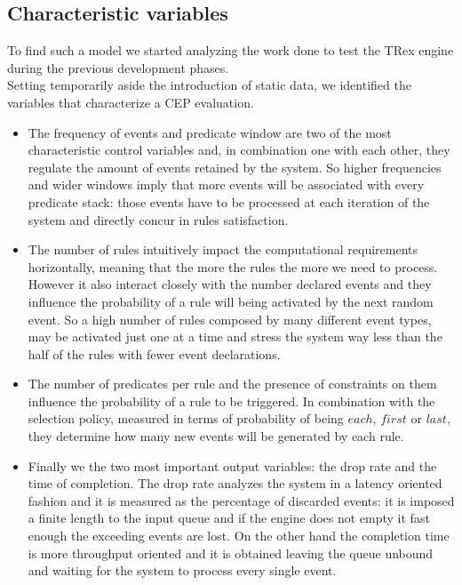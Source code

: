 \subsection{Characteristic variables}
To find such a model we started analyzing the work done to test the TRex engine during the previous development phases.\\
Setting temporarily aside the introduction of static data, we identified the variables that characterize a CEP evaluation.
\begin{itemize}
\item The frequency of events and predicate window are two of the most characteristic control variables and, in combination one with each other, they regulate the amount of events retained by the system. So higher frequencies and wider windows imply that more events will be associated with every predicate stack: those events have to be processed at each iteration of the system and directly concur in rules satisfaction.
\item The number of rules intuitively impact the computational requirements horizontally, meaning that the more the rules the more we need to process. However it also interact closely with the number declared events and they influence the probability of a rule will being activated by the next random event. So a high number of rules composed by many different event types, may be activated just one at a time and stress the system way less than the half of the rules with fewer event declarations.
\item The number of predicates per rule and the presence of constraints on them influence the probability of a rule to be triggered. In combination with the selection policy, measured in terms of probability of being $each$, $first$ or $last$, they determine how many new events will be generated by each rule.
\item Finally we the two most important output variables: the drop rate and the time of completion. The drop rate analyzes the system in a latency oriented fashion and it is measured as the percentage of discarded events: it is imposed a finite length to the input queue and if the engine does not empty it fast enough the exceeding events are lost. On the other hand the completion time is more throughput oriented and it is obtained leaving the queue unbound and waiting for the system to process every single event.
\end{itemize}

